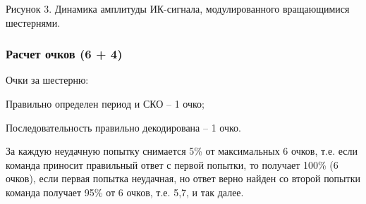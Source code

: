 
\begin{center}
    Рисунок 3. Динамика амплитуды ИК-сигнала, модулированного вращающимися шестернями.
\end{center}

\subsubsection*{Расчет очков (6 + 4)}

Очки за шестерню:

Правильно определен период и СКО – 1 очко;

Последовательность правильно декодирована – 1 очко.

За каждую неудачную попытку снимается 5\% от максимальных 6 очков, т.е. если команда приносит правильный ответ с первой попытки, то получает 100\% (6 очков), если первая попытка неудачная, но ответ верно найден со второй попытки команда получает 95\% от 6 очков, т.е. 5,7, и так далее.
